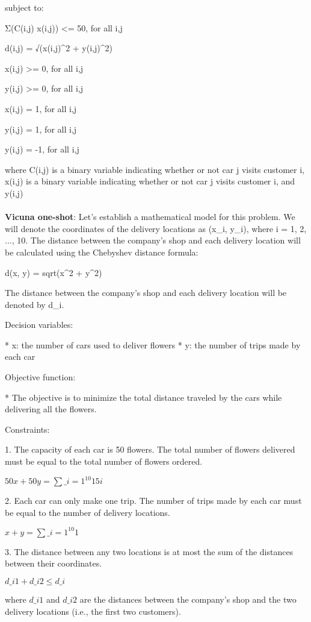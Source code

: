 \documentclass{article}%
\begin{document}
subject to:

Σ(C(i,j) \* x(i,j)) <= 50, for all i,j

d(i,j) = √(x(i,j)^2 + y(i,j)^2)

x(i,j) >= 0, for all i,j

y(i,j) >= 0, for all i,j

x(i,j) = 1, for all i,j

y(i,j) = 1, for all i,j

y(i,j) = -1, for all i,j

where C(i,j) is a binary variable indicating whether or not car j visits customer i, x(i,j) is a binary variable indicating whether or not car j visits customer i, and y(i,j)\\\\%
\textbf{Vicuna one-shot}: Let's establish a mathematical model for this problem. We will denote the coordinates of the delivery locations as (x\_i, y\_i), where i = 1, 2, ..., 10. The distance between the company's shop and each delivery location will be calculated using the Chebyshev distance formula:

d(x, y) = sqrt(x^2 + y^2)

The distance between the company's shop and each delivery location will be denoted by d\_i.

Decision variables:

* x: the number of cars used to deliver flowers
* y: the number of trips made by each car

Objective function:

* The objective is to minimize the total distance traveled by the cars while delivering all the flowers.

Constraints:

1. The capacity of each car is 50 flowers. The total number of flowers delivered must be equal to the total number of flowers ordered.

$50x + 50y = \sum\_{i=1}^{10} 15i$

2. Each car can only make one trip. The number of trips made by each car must be equal to the number of delivery locations.

$x + y = \sum\_{i=1}^{10} 1$

3. The distance between any two locations is at most the sum of the distances between their coordinates.

$d\_{i1} + d\_{i2} \leq d\_i$

where $d\_{i1}$ and $d\_{i2}$ are the distances between the company's shop and the two delivery locations (i.e., the first two customers).
\end{document}
